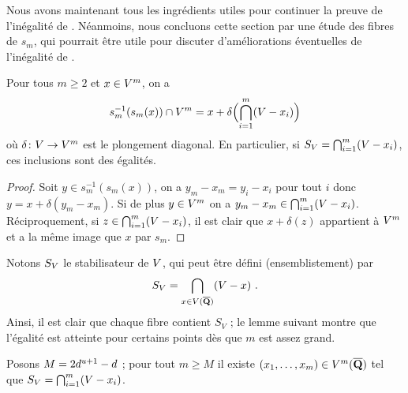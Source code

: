 Nous avons maintenant tous les ingrédients utiles pour continuer la preuve de
l'inégalité de . Néanmoins, nous concluons cette section par une
étude des fibres de \( s_m \), qui pourrait être utile pour discuter
d'améliorations éventuelles de l'inégalité de .

\begin{lem}
  Pour tous \( m \ge 2 \) et \( x \in V^m \), on a
  \begin{equation}
    s_m^{-1} ( s_m(x) ) \cap V^m
    =
    x + \delta\Bigl( \bigcap_{i=1}^m (V - x_i) \Bigr)
  \end{equation}
  où \( \delta \colon V \to V^m \) est le plongement diagonal. En
  particulier, si \( S_V = \bigcap_{i=1}^m (V - x_i) \), ces inclusions
  sont des égalités.
\end{lem}

\begin{proof}
  Soit \( y \in s_m^{-1} ( s_m(x) ) \), on a
  \( y_m - x_m = y_i - x_i \) pour tout \( i \) donc \( y = x + \delta(y_m -
    x_m) \). Si de plus \( y \in V^m \) on a \( y_m - x_m \in
    \bigcap_{i=1}^m (V - x_i) \). Réciproquement, si \( z \in
    \bigcap_{i=1}^m (V - x_i) \), il est clair que \( x + \delta(z) \)
  appartient à \( V^m \) et a la même image que \( x \) par \( s_m \).
\end{proof}

Notons \( S_V \) le stabilisateur de \( V \), qui peut être défini
(ensemblistement) par
\begin{equation}
  S_V = \bigcap_{x \in V(\overline{{\mathbf{Q}}})} (V - x)
  \text{ .}
\end{equation}
Ainsi, il est clair que chaque fibre contient \( S_V \) ; le lemme suivant
montre que l'égalité est atteinte pour certains points dès que \( m \) est
assez grand.

\begin{lem}
  Posons \( M = 2 d^{u+1} - d \) ; pour tout \( m \ge M \) il
  existe \( (x_1, \dots, x_m) \in V^m(\overline{{\mathbf{Q}}}) \) tel que
  \( S_V = \bigcap_{i=1}^m (V - x_i) \).
\end{lem}


